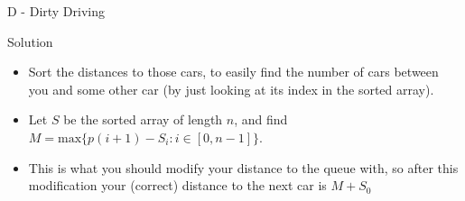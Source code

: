 \renewcommand{\insertshortauthor}{Jon Marius Venstad}
\begin{frame}{D - Dirty Driving}

\begin{block}{Solution}
  \begin{itemize}
	\item Sort the distances to those cars, to easily find the number of cars between you and some other car (by just looking at its index in the sorted array).
	\item Let $S$ be the sorted array of length $n$, and find $M = \textrm{max}\{p(i+1) - S_i : i \in [0, n-1]\}$. 
	\item This is what you should modify your distance to the queue with, so after this modification your (correct) distance to the next car is $M + S_0$
  \end{itemize}
\end{block}

\end{frame}
